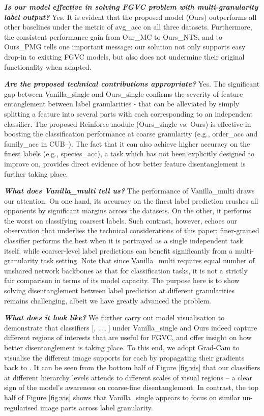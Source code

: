 \documentclass[final]{cvpr}
\newcommand{\keypoint}[1]{\vspace{0.05cm}\noindent\textbf{#1}\quad}
\begin{document}
\keypoint{\emph{Is our model effective in solving FGVC problem with multi-granularity label output?}} Yes. It is evident that the proposed model (Ours) outperforms all other baselines under the metric of avg\_acc on all three datasets. Furthermore, the consistent performance gain from Our\_MC to Ours\_NTS, and to Ours\_PMG tells one important message: our solution not only supports easy drop-in to existing FGVC models, but also does not undermine their original functionality when adapted.

\keypoint{\emph{Are the proposed technical contributions appropriate?}} Yes. The significant gap between Vanilla\_single and Ours\_single confirms the severity of feature entanglement between label granularities - that can be alleviated by simply splitting a feature into several parts with each corresponding to an independent classifier. The proposed Reinforce module (Ours\_single vs. Ours) is effective in boosting the 
classification performance at coarse granularity (e.g., order\_acc and family\_acc in CUB--). The fact that it can also achieve higher accuracy on the finest labels (e.g., species\_acc), a task which has not been explicitly designed to improve on, provides direct evidence of how better feature disentanglement is further taking place.

\keypoint{\emph{What does Vanilla\_multi tell us?}} The performance of Vanilla\_multi draws our attention. On one hand, its accuracy on the finest label prediction crushes all opponents by significant margins across the datasets. On the other, it performs the worst on classifying coarsest labels. Such contrast, however, echoes our observation that underlies the technical considerations of this paper: finer-grained classifier performs the best when it is portrayed as a single independent task itself, while coarser-level label predictions can benefit significantly from a multi-granularity task setting. Note that since Vanilla\_multi requires equal number of unshared network backbones as that for classification tasks, it is not a strictly fair comparison in terms of its model capacity. The purpose here is to show solving disentanglement between label prediction at different granularities remains challenging, albeit we have greatly advanced the problem.

\keypoint{\emph{What does it look like?}} {We further carry out model visualisation to demonstrate that classifiers [, ..., ] under Vanilla\_single and Ours indeed capture different regions of interests that are useful for FGVC, and offer insight on how better disentanglement is taking place. To this end, we adopt Grad-Cam \cite{selvaraju2017grad} to visualise the different image supports for each  by propagating their gradients back to . It can be seen from the bottom half of Figure \ref{fig:vis} that our classifiers at different hierarchy levels attends to different scales of visual regions -- a clear sign of the model's awareness on coarse-fine disentanglement. In contrast, the top half of Figure \ref{fig:vis} shows that Vanilla\_single appears to focus on similar un-regularised image parts across label granularity.} 
\end{document}
